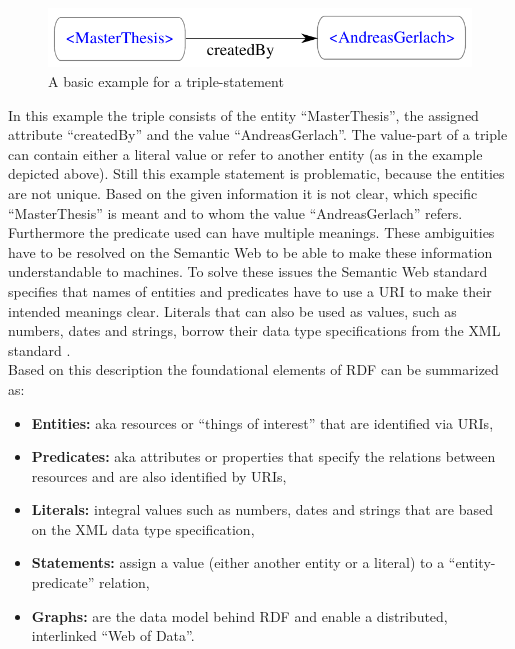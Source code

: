 \begin{figure}[H]
	\centering
		\includegraphics[width=0.8\columnwidth]{images/sample_triple.pdf}
	\caption{A basic example for a triple-statement}
\label{fig:images_semweb_triple}
\end{figure}

In this example the triple consists of the entity ``MasterThesis'', the assigned attribute ``createdBy'' and the value ``AndreasGerlach''. The value-part of a triple can contain either a literal value or refer to another entity (as in the example depicted above). Still this example statement is problematic, because the entities are not unique. Based on the given information it is not clear, which specific ``MasterThesis'' is meant and to whom the value ``AndreasGerlach'' refers. Furthermore the predicate used can have multiple meanings. These ambiguities have to be resolved on the Semantic Web to be able to make these information understandable to machines. To solve these issues the Semantic Web standard specifies that names of entities and predicates have to use a \gls{URI} to make their intended meanings clear. Literals that can also be used as values, such as numbers, dates and strings, borrow their data type specifications from the \gls{XML} standard \citep[pg. 15-38]{wood2014linked}. \\

Based on this description the foundational elements of \gls{RDF} can be summarized as: \@

\begin{itemize}
	\item \textbf{Entities:} aka resources or ``things of interest'' that are identified via \gls{URI}s,
	\item \textbf{Predicates:} aka attributes or properties that specify the relations between resources and are also identified by \gls{URI}s,
	\item \textbf{Literals:} integral values such as numbers, dates and strings that are based on the \gls{XML} data type specification,
	\item \textbf{Statements:} assign a value (either another entity or a literal) to a ``entity-predicate'' relation,
	\item \textbf{Graphs:} are the data model behind \gls{RDF} and enable a  distributed, interlinked ``Web of Data''.
\end{itemize}

